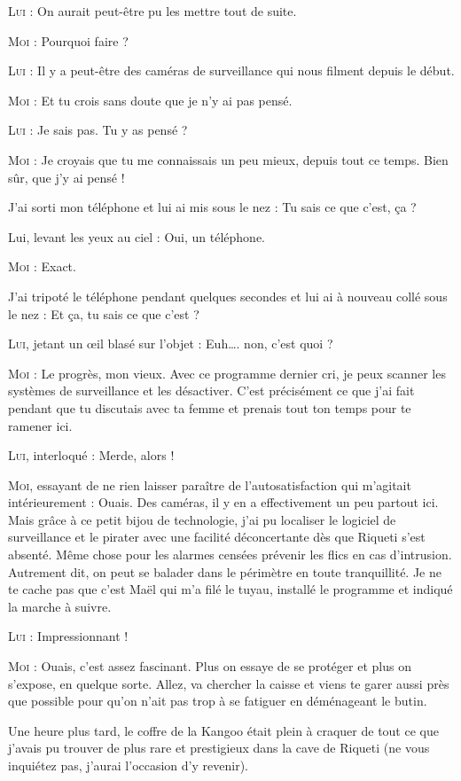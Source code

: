 \textsc{Lui} : On aurait peut-être pu les mettre tout de suite.

\textsc{Moi} : Pourquoi faire ?

\textsc{Lui} : Il y a peut-être des caméras de surveillance qui nous filment depuis le début.

\textsc{Moi} : Et tu crois sans doute que je n’y ai pas pensé.

\textsc{Lui} : Je sais pas. Tu y as pensé ?

\textsc{Moi} : Je croyais que tu me connaissais un peu mieux, depuis tout ce temps. Bien sûr, que j’y ai pensé !

J’ai sorti mon téléphone et lui ai mis sous le nez : Tu sais ce que c’est, ça ?

Lui, levant les yeux au ciel : Oui, un téléphone.

\textsc{Moi} : Exact.

J’ai tripoté le téléphone pendant quelques secondes et lui ai à nouveau collé sous le nez : Et ça, tu sais ce que c’est ?

\textsc{Lui}, jetant un œil blasé sur l’objet : Euh…. non, c’est quoi ?

\textsc{Moi} : Le progrès, mon vieux. Avec ce programme dernier cri, je peux scanner les systèmes de surveillance et les désactiver. C’est précisément ce que j’ai fait pendant que tu discutais avec ta femme et prenais tout ton temps pour te ramener ici.

\textsc{Lui}, interloqué : Merde, alors !

\textsc{Moi}, essayant de ne rien laisser paraître de l’autosatisfaction qui m’agitait intérieurement : Ouais. Des caméras, il y en a effectivement un peu partout ici. Mais grâce à ce petit bijou de technologie, j’ai pu localiser le logiciel de surveillance et le pirater avec une facilité déconcertante dès que Riqueti s’est absenté. Même chose pour les alarmes censées prévenir les flics en cas d’intrusion. Autrement dit, on peut se balader dans le périmètre en toute tranquillité. Je ne te cache pas que c’est Maël qui m’a filé le tuyau, installé le programme et indiqué la marche à suivre.

\textsc{Lui} : Impressionnant !

\textsc{Moi} : Ouais, c’est assez fascinant. Plus on essaye de se protéger et plus on s’expose, en quelque sorte. Allez, va chercher la caisse et viens te garer aussi près que possible pour qu’on n’ait pas trop à se fatiguer en déménageant le butin.

Une heure plus tard, le coffre de la Kangoo était plein à craquer de tout ce que j’avais pu trouver de plus rare et prestigieux dans la cave de Riqueti (ne vous inquiétez pas, j’aurai l’occasion d’y revenir).

